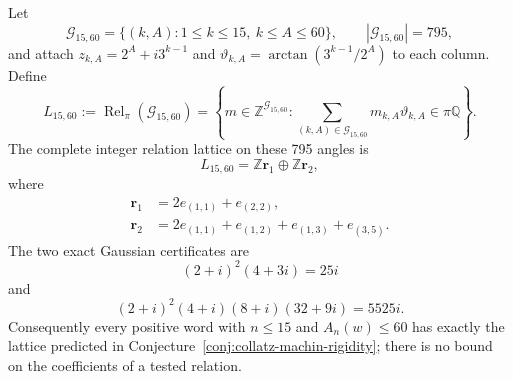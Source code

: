 \begin{theorem}
\label{thm:collatz-machin-finite-census}
Let
\[
 \mathcal G_{15,60}
 =\{(k,A):1\leq k\leq15,\ k\leq A\leq60\},
 \qquad |\mathcal G_{15,60}|=795,
\]
and attach
 $z_{k,A}=2^A+i3^{k-1}$ and
 $\vartheta_{k,A}=\arctan(3^{k-1}/2^A)$ to each column.  Define
\[
 L_{15,60}:=\operatorname{Rel}_{\pi}(\mathcal G_{15,60})
 =\left\{m\in\mathbb Z^{\mathcal G_{15,60}}:
 \sum_{(k,A)\in\mathcal G_{15,60}}m_{k,A}\vartheta_{k,A}
 \in\pi\mathbb Q\right\}.
\]
The complete integer relation lattice on these 795 angles is
\begin{equation}
\label{eq:collatz-machin-grid-lattice}
 L_{15,60}=\mathbb Z\mathbf r_1\oplus\mathbb Z\mathbf r_2,
\end{equation}
where
\begin{align*}
 \mathbf r_1&=2e_{(1,1)}+e_{(2,2)},\\
 \mathbf r_2&=2e_{(1,1)}+e_{(1,2)}+e_{(1,3)}+e_{(3,5)}.
\end{align*}
The two exact Gaussian certificates are
\[
 (2+i)^2(4+3i)=25i
\]
and
\[
 (2+i)^2(4+i)(8+i)(32+9i)=5525i.
\]
Consequently every positive word with $n\leq15$ and $A_n(w)\leq60$ has
exactly the lattice predicted in Conjecture~\ref{conj:collatz-machin-rigidity};
there is no bound on the coefficients of a tested relation.
\end{theorem}


